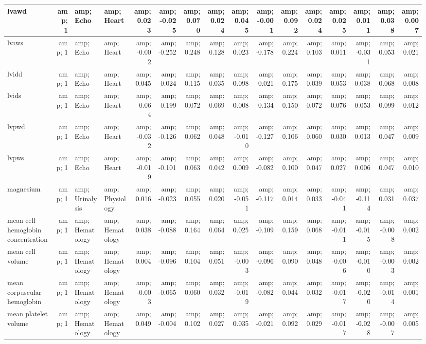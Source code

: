 \documentclass[]{article}
\begin{document}
\begin{table}
\begin{tabular}[t]{l|r|l|l|r|r|r|r|r|r|r|r|r|r|r|r}
\hline
lvawd &amp; 1 &amp; Echo &amp; Heart &amp; 0.023 &amp; -0.025 &amp; 0.070 &amp; 0.024 &amp; 0.045 &amp; -0.001 &amp; 0.092 &amp; 0.024 &amp; 0.025 &amp; 0.011 &amp; 0.038 &amp; 0.007\\
\hline
lvaws &amp; 1 &amp; Echo &amp; Heart &amp; -0.002 &amp; -0.252 &amp; 0.248 &amp; 0.128 &amp; 0.023 &amp; -0.178 &amp; 0.224 &amp; 0.103 &amp; 0.011 &amp; -0.031 &amp; 0.053 &amp; 0.021\\
\hline
lvidd &amp; 1 &amp; Echo &amp; Heart &amp; 0.045 &amp; -0.024 &amp; 0.115 &amp; 0.035 &amp; 0.098 &amp; 0.021 &amp; 0.175 &amp; 0.039 &amp; 0.053 &amp; 0.038 &amp; 0.068 &amp; 0.008\\
\hline
lvids &amp; 1 &amp; Echo &amp; Heart &amp; -0.064 &amp; -0.199 &amp; 0.072 &amp; 0.069 &amp; 0.008 &amp; -0.134 &amp; 0.150 &amp; 0.072 &amp; 0.076 &amp; 0.053 &amp; 0.099 &amp; 0.012\\
\hline
lvpwd &amp; 1 &amp; Echo &amp; Heart &amp; -0.032 &amp; -0.126 &amp; 0.062 &amp; 0.048 &amp; -0.010 &amp; -0.127 &amp; 0.106 &amp; 0.060 &amp; 0.030 &amp; 0.013 &amp; 0.047 &amp; 0.009\\
\hline
lvpws &amp; 1 &amp; Echo &amp; Heart &amp; -0.019 &amp; -0.101 &amp; 0.063 &amp; 0.042 &amp; 0.009 &amp; -0.082 &amp; 0.100 &amp; 0.047 &amp; 0.027 &amp; 0.006 &amp; 0.047 &amp; 0.010\\
\hline
magnesium &amp; 1 &amp; Urinalysis &amp; Physiology &amp; 0.016 &amp; -0.023 &amp; 0.055 &amp; 0.020 &amp; -0.051 &amp; -0.117 &amp; 0.014 &amp; 0.033 &amp; -0.041 &amp; -0.114 &amp; 0.031 &amp; 0.037\\
\hline
mean cell hemoglobin concentration &amp; 1 &amp; Hematology &amp; Hematology &amp; 0.038 &amp; -0.088 &amp; 0.164 &amp; 0.064 &amp; 0.025 &amp; -0.109 &amp; 0.159 &amp; 0.068 &amp; -0.011 &amp; -0.015 &amp; -0.008 &amp; 0.002\\
\hline
mean cell volume &amp; 1 &amp; Hematology &amp; Hematology &amp; 0.004 &amp; -0.096 &amp; 0.104 &amp; 0.051 &amp; -0.003 &amp; -0.096 &amp; 0.090 &amp; 0.048 &amp; -0.006 &amp; -0.010 &amp; -0.003 &amp; 0.002\\
\hline
mean corpuscular hemoglobin &amp; 1 &amp; Hematology &amp; Hematology &amp; -0.003 &amp; -0.065 &amp; 0.060 &amp; 0.032 &amp; -0.019 &amp; -0.082 &amp; 0.044 &amp; 0.032 &amp; -0.017 &amp; -0.020 &amp; -0.014 &amp; 0.001\\
\hline
mean platelet volume &amp; 1 &amp; Hematology &amp; Hematology &amp; 0.049 &amp; -0.004 &amp; 0.102 &amp; 0.027 &amp; 0.035 &amp; -0.021 &amp; 0.092 &amp; 0.029 &amp; -0.017 &amp; -0.028 &amp; -0.007 &amp; 0.005\\

\end{tabular}
\end{table}
\end{document}
